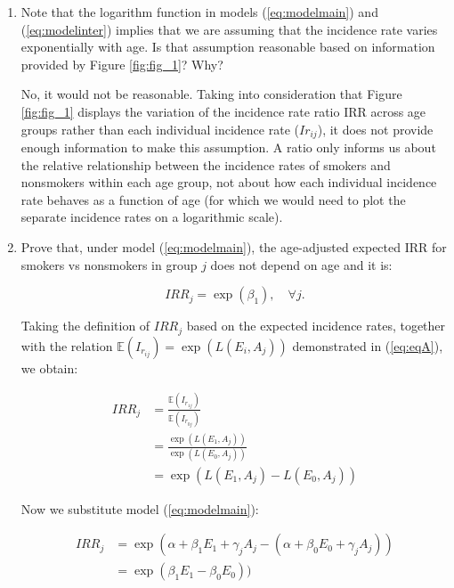 \documentclass[a4paper,10pt]{article}\usepackage[]{graphicx}\usepackage[]{xcolor}
\begin{document}
\begin{enumerate}
  \item Note that the logarithm function in models (\ref{eq:modelmain}) and (\ref{eq:modelinter}) implies that we are assuming that the incidence rate varies exponentially with age. Is that assumption reasonable based on information provided by Figure \ref{fig:fig_1}? Why?


No, it would not be reasonable. Taking into consideration that Figure \ref{fig:fig_1} displays the variation of the incidence rate ratio IRR across age groups rather than each individual incidence rate ($Ir_{ij}$), it does not provide enough information to make this assumption. A ratio only informs us about the relative relationship between the incidence rates of smokers and nonsmokers within each age group, not about how each individual incidence rate behaves as a function of age (for which we would need to plot the separate incidence rates on a logarithmic scale).

  \item Prove that, under model (\ref{eq:modelmain}), the age-adjusted expected IRR for smokers vs nonsmokers in group \(j\) does not depend on age and it is:

  \begin{equation}
  \label{eq:eq3}
  IRR_{j}=\exp(\beta_{1}), \quad \forall j.
  \end{equation}

  

Taking the definition of $IRR_j$ based on the expected incidence rates, together with the relation $\mathbb{E}(I_{r_{ij}})=\exp(L(E_{i},A_{j}))$ demonstrated in (\ref{eq:eqA}), we obtain:
  
  \begin{equation*}
  \begin{aligned}
    IRR_{j} &= \frac{ \mathbb{E}(I_{r_{1j}}) }
                    { \mathbb{E}(I_{r_{0j}}) } \\ 
            &= \frac{ \exp(L(E_{1},A_{j})) }
                    { \exp(L(E_{0},A_{j})) } \\ 
            &= \exp(L(E_{1},A_{j}) - L(E_{0},A_{j}))
  \end{aligned}
  \end{equation*}

Now we substitute model (\ref{eq:modelmain}):

  \begin{equation*}
  \begin{aligned}
    IRR_{j} &= \exp(\alpha+\beta_{1}E_{1}+\gamma_{j}A_{j} - (\alpha+\beta_{0}E_{0}+\gamma_{j}A_{j})) \\ 
            &= \exp(\beta_{1}E_{1} - \beta_{0}E_{0}))
  \end{aligned}
  \end{equation*}
  

\end{enumerate}
\end{document}
